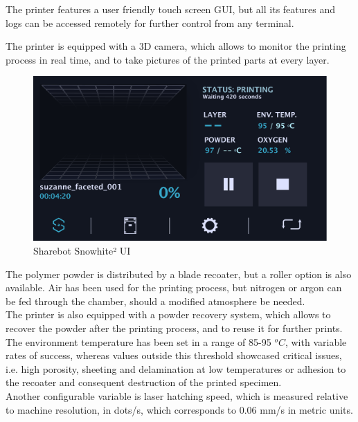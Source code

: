 \documentclass{article}
\begin{document}
        The printer features a user friendly touch screen GUI, but all its features and logs can be accessed remotely for further control from any terminal.  

        The printer is equipped with a 3D camera, which allows to monitor the printing process in real time, 
        and to take pictures of the printed parts at every layer. \\

        \begin{figure}[h!]
            \centering
            \includegraphics[width=\textwidth]{Pictures/Sharebot_GUI.pdf}
            \caption{Sharebot Snowhite² UI}
            \label{fig:Sharebot_UI}
        \end{figure}

        The polymer powder is distributed by a blade recoater, but a roller option is also available. 
        Air has been used for the printing process, but nitrogen or argon can be fed through the chamber, 
        should a modified atmosphere be needed.  \\

        The printer is also equipped with a powder recovery system, which allows to recover the powder 
        after the printing process, and to reuse it for further prints. \\ 

        The environment temperature has been set in a range of 85-95 $^oC$, with variable rates of success, 
        whereas values outside this threshold showcased critical issues, i.e. high porosity, sheeting and 
        delamination at low temperatures or adhesion to the recoater and consequent destruction of the printed specimen. \\ 

        Another configurable variable is laser hatching speed, which is measured relative to machine resolution, in dots/s, 
        which corresponds to 0.06 mm/s in metric units. 
\end{document}
